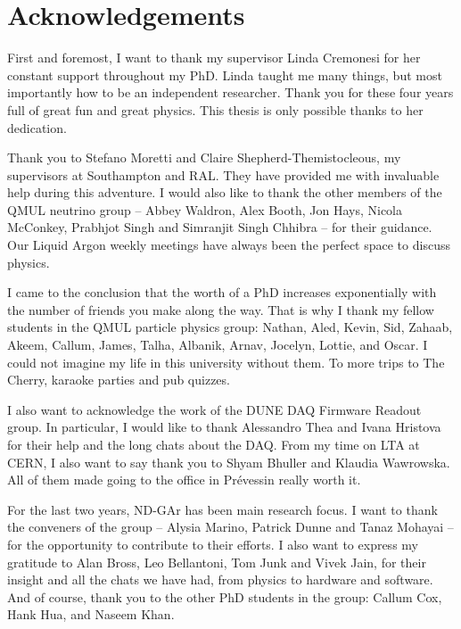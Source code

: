  \chapter*{Acknowledgements}
\label{C:Acknowledgements}

First and foremost, I want to thank my supervisor Linda Cremonesi for her constant support throughout my PhD. Linda taught me many things, but most importantly how to be an independent researcher. Thank you for these four years full of great fun and great physics. This thesis is only possible thanks to her dedication.

Thank you to Stefano Moretti and Claire Shepherd-Themistocleous, my supervisors at Southampton and RAL. They have provided me with invaluable help during this adventure. I would also like to thank the other members of the QMUL neutrino group -- Abbey Waldron, Alex Booth, Jon Hays, Nicola McConkey, Prabhjot Singh and Simranjit Singh Chhibra -- for their guidance. Our Liquid Argon weekly meetings have always been the perfect space to discuss physics.

I came to the conclusion that the worth of a PhD increases exponentially with the number of friends you make along the way. That is why I thank my fellow students in the QMUL particle physics group: Nathan, Aled, Kevin, Sid, Zahaab, Akeem, Callum, James, Talha, Albanik, Arnav, Jocelyn, Lottie, and Oscar. I could not imagine my life in this university without them. To more trips to The Cherry, karaoke parties and pub quizzes.

I also want to acknowledge the work of the DUNE DAQ Firmware Readout group. In particular, I would like to thank Alessandro Thea and Ivana Hristova for their help and the long chats about the DAQ. From my time on LTA at CERN, I also want to say thank you to Shyam Bhuller and Klaudia Wawrowska. All of them made going to the office in Pr\'{e}vessin really worth it.

For the last two years, ND-GAr has been main research focus. I want to thank the conveners of the group -- Alysia Marino, Patrick Dunne and Tanaz Mohayai -- for the opportunity to contribute to their efforts. I also want to express my gratitude to Alan Bross, Leo Bellantoni, Tom Junk and Vivek Jain, for their insight and all the chats we have had, from physics to hardware and software. And of course, thank you to the other PhD students in the group: Callum Cox, Hank Hua, and Naseem Khan.

